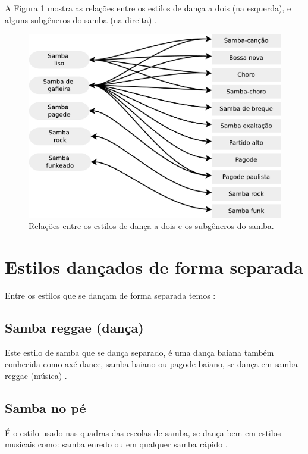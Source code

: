 A Figura \ref{fig:sambadavavsmusica} mostra as relações entre os estilos de dança a dois (na esquerda),
 e alguns subgêneros do samba (na direita) \cite[pp. 134-138]{perna2002samba}.

\begin{figure}[h]
  \centering
    \includegraphics[width=1.0\textwidth]{chapters/cap-historia-dancasamba/dancavcmusica.eps}
  \caption{Relações entre os estilos de dança a dois e os subgêneros do samba.}
\label{fig:sambadavavsmusica}
\end{figure}

\section{Estilos dançados de forma separada}
Entre os estilos que se dançam de forma separada temos \cite[pp. 134]{perna2002samba}:

\subsection{Samba reggae  (dança)} 
Este estilo de samba que se dança separado, 
é uma dança baiana também conhecida como axé-dance, samba baiano ou pagode baiano,
se dança em samba reggae (música) \cite[pp. 134]{perna2002samba}.

\subsection{Samba no pé} 
É o estilo usado nas quadras das escolas de samba,
se dança bem em estilos musicais como: 
samba enredo ou em qualquer samba rápido  \cite[pp. 134]{perna2002samba}.

